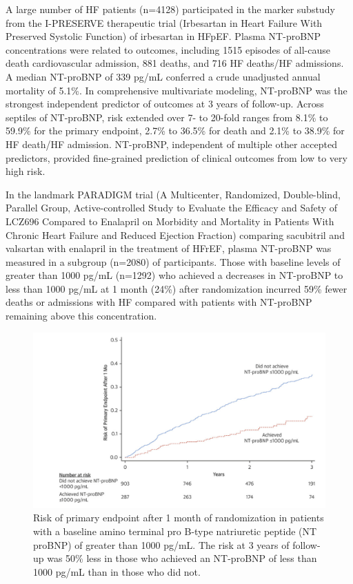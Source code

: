 \documentclass[14pt,a4paper,onecolumn]{extarticle}
\begin{document}
A large number of HF patients (n=4128) participated in the marker substudy from the I-PRESERVE therapeutic trial (Irbesartan in Heart Failure With Preserved Systolic Function) of irbesartan in HFpEF. Plasma NT-proBNP concentrations were related to outcomes, including 1515 episodes of all-cause death cardiovascular admission, 881 deaths, and 716 HF deaths/HF admissions. A median NT-proBNP of 339 pg/mL conferred a crude unadjusted annual mortality of 5.1\%. In comprehensive multivariate modeling, NT-proBNP was the strongest independent predictor of outcomes at 3 years of follow-up. Across septiles of NT-proBNP, risk extended over 7- to 20-fold ranges from 8.1\% to 59.9\% for the primary endpoint, 2.7\% to 36.5\% for death and 2.1\% to 38.9\% for HF death/HF admission. NT-proBNP, independent of multiple other accepted predictors, provided fine-grained prediction of clinical outcomes from low to very high risk. \citep{Komajda2011} %

In the landmark PARADIGM trial (A Multicenter, Randomized, Double-blind, Parallel Group, Active-controlled Study to Evaluate the Efficacy and Safety of LCZ696 Compared to Enalapril on Morbidity and Mortality in Patients With Chronic Heart Failure and Reduced Ejection Fraction) comparing sacubitril and valsartan with enalapril in the treatment of HFrEF, plasma NT-proBNP was measured in a subgroup (n=2080) of participants.  Those with baseline levels of greater than 1000 pg/mL (n=1292) who achieved a decreases in NT-proBNP to less than 1000 pg/mL at 1 month (24\%) after randomization incurred 59\% fewer deaths or admissions with HF compared with patients with NT-proBNP remaining above this concentration. \citep{Zile2016} %

\begin{figure}   \includegraphics{../../images/NTBNP_zile.png}   \caption{Risk of primary endpoint after 1 month of randomization in patients with a baseline amino terminal pro B-type natriuretic peptide (NT proBNP) of greater than 1000 pg/mL. The risk at 3 years of follow-up was 50\% less in those who achieved an NT-proBNP of less than 1000 pg/mL than in those who did not. \citep{Zile2016}}   \label{NTBNP_zile} \end{figure} %
\end{document}
